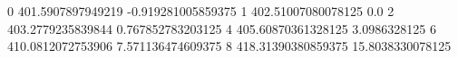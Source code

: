 0 401.5907897949219 -0.919281005859375
1 402.51007080078125 0.0
2 403.2779235839844 0.767852783203125
4 405.60870361328125 3.0986328125
6 410.0812072753906 7.571136474609375
8 418.31390380859375 15.8038330078125
